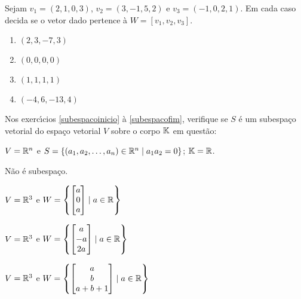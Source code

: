 \documentclass[12pt]{exam}
\begin{document}
\begin{exercicio}
    Sejam $v_1 = (2, 1, 0, 3)$, $v_2 = (3, -1, 5, 2)$ e $v_3 = (-1, 0, 2, 1)$. Em cada caso decida se o vetor dado pertence à $W = [v_1, v_2, v_3]$.
    \begin{multicols}{2}
        \begin{enumerate}[label={\alph*})]
            \item $(2, 3, -7, 3)$

            \item $(0, 0, 0, 0)$

            \item $(1, 1, 1, 1)$

            \item $(-4, 6, -13, 4)$
        \end{enumerate}
    \end{multicols}
\end{exercicio}

Nos exerc{\'\i}cios \ref{subespacoinicio} \`a \ref{subespacofim}, verifique se $S$ \'e um subespa\c{c}o vetorial do espa\c{c}o vetorial $V$ sobre o corpo $\mathbb{K}$ em quest\~ao:
\begin{exercicio}\label{subespacoinicio}
	$V = \mathbb{R}^n$ e $S = \{(a_1, a_2, \dots, a_n) \in \mathbb{R}^n \mid a_1a_2 = 0\}$; $\mathbb{K} = \mathbb{R}$.
	\begin{solucao}
		N\~ao \'e subespa\c{c}o.
	\end{solucao}
\end{exercicio}

\begin{exercicio}
    $V = \mathbb{R}^3$ e $W = \left\{\begin{bmatrix}a\\0\\a\end{bmatrix} \mid a \in \mathbb{R}\right\}$
\end{exercicio}

\begin{exercicio}
    $V = \mathbb{R}^3$ e $W = \left\{\begin{bmatrix}a\\-a\\2a\end{bmatrix} \mid a \in \mathbb{R}\right\}$
\end{exercicio}

\begin{exercicio}
    $V = \mathbb{R}^3$ e $W = \left\{\begin{bmatrix}a\\b\\a + b + 1\end{bmatrix} \mid a \in \mathbb{R}\right\}$
\end{exercicio}
\end{document}
